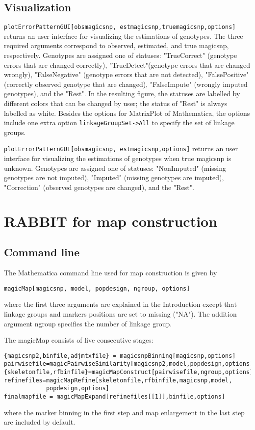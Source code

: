 \documentclass[12pt]{article}
\begin{document}
\subsection{Visualization}

\verb|plotErrorPatternGUI[obsmagicsnp, estmagicsnp,truemagicsnp,options]| returns an user interface for visualizing the estimations of genotypes. The three required arguments correspond to observed, estimated, and true magicsnp, respectively. Genotypes are assigned one of statuses: "TrueCorrect" (genotype errors that are changed correctly), "TrueDetect"(genotype errors that are changed wrongly), "FalseNegative" (genotype errors that are not detected), "FalsePositive" (correctly observed genotype that are changed), "FalseImpute" (wrongly imputed genotypes), and the "Rest". In the resulting figure, the statuses are labelled  by different colors that can be changed by user; the status of "Rest" is always labelled  as white. Besides the options for MatrixPlot of Mathematica, the options include one extra option \verb|linkageGroupSet->All| to specify the set of linkage groups. 

\verb|plotErrorPatternGUI[obsmagicsnp, estmagicsnp,options]| returns an user interface for visualizing the estimations of genotypes when true magicsnp is unknown. Genotypes are assigned one of statuses: "NonImputed" (missing genotypes are not imputed), "Imputed" (missing genotypes are imputed), "Correction" (observed genotypes are changed), and  the "Rest". 

\section{RABBIT for map construction}
\subsection{Command line}
The Mathematica command line used for map construction is given by
\begin{verbatim}
magicMap[magicsnp, model, popdesign, ngroup, options]
\end{verbatim}
where the first three arguments are explained in the Introduction except that linkage groups and markers positions are set to missing ("NA"). The addition argument ngroup specifies the number of linkage group. 

The magicMap consists of five consecutive stages: 

\begin{verbatim}
{magicsnp2,binfile,adjmtxfile} = magicsnpBinning[magicsnp,options]
pairwisefile=magicPairwiseSimilarity[magicsnp2,model,popdesign,options]
{skeletonfile,rfbinfile}=magicMapConstruct[pairwisefile,ngroup,options]
refinefiles=magicMapRefine[skeletonfile,rfbinfile,magicsnp,model,
            popdesign,options]
finalmapfile = magicMapExpand[refinefiles[[1]],binfile,options]
\end{verbatim} 
\noindent 
where the marker binning in the first step and map enlargement in the last step are included by default. 
\end{document}
